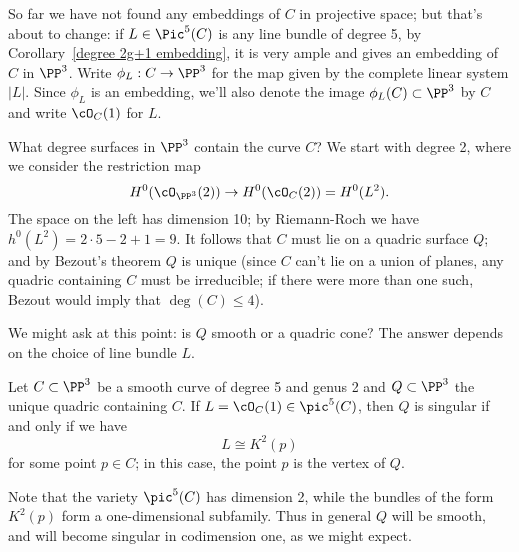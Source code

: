 So far we have not found any embeddings of $C$ in projective space; but that's about to change: if $L \in \Pic^5(C)$ is any line bundle of degree 5, by Corollary~\ref{degree 2g+1 embedding}, it is very ample and gives an embedding of $C$ in $\PP^3$.
Write $\phi_L : C \to \PP^3$ for the map given by the complete linear system $|L|$. Since $\phi_L$ is an embedding, we'll also denote the image $\phi_L(C) \subset \PP^3$ by $C$ and write $\cO_C(1)$ for $L$.

What degree surfaces in $\PP^3$ contain the curve $C$? We start with degree 2, where we consider the restriction map
$$
H^0(\cO_{\PP^3}(2)) \to H^0(\cO_C(2)) = H^0(L^2).
$$
The space on the left has dimension 10; by Riemann-Roch we have $h^0(L^2) = 2\cdot5 - 2 + 1 = 9$. It follows that $C$ must lie on a quadric surface $Q$; and by Bezout's  theorem  $Q$ is unique (since $C$ can't lie on a union of planes, any quadric containing $C$ must be irreducible; if there were more than one such, Bezout would imply that $\deg(C) \leq 4$).

We might ask at this point: is $Q$ smooth or a quadric cone? The answer depends on the choice of line bundle $L$. 

\begin{proposition}\label{genus 2 embedding}
Let $C \subset \PP^3$ be a smooth curve of degree 5 and genus 2 and $Q \subset \PP^3$ the unique quadric containing $C$. If $L = \cO_C(1) \in \pic^5(C)$, then $Q$ is singular if and only if we have
$$
L \cong K^2(p)
$$
for some point $p \in C$; in this case, the point $p$ is the vertex of $Q$.
\end{proposition}

Note that the variety $\pic^5(C)$ has dimension 2, while the bundles of the form $K^2(p)$ form a one-dimensional subfamily. Thus in general $Q$ will be smooth, and will become singular in codimension one, as we might expect.

